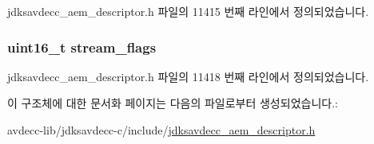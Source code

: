 jdksavdecc\+\_\+aem\+\_\+descriptor.\+h 파일의 11415 번째 라인에서 정의되었습니다.

\subsubsection[{\texorpdfstring{stream\+\_\+flags}{stream_flags}}]{\setlength{\rightskip}{0pt plus 5cm}uint16\+\_\+t stream\+\_\+flags}\hypertarget{structjdksavdecc__descriptor__stream_ae7a5037df4d2baee5b2d23e8c1add96e}{}\label{structjdksavdecc__descriptor__stream_ae7a5037df4d2baee5b2d23e8c1add96e}


jdksavdecc\+\_\+aem\+\_\+descriptor.\+h 파일의 11418 번째 라인에서 정의되었습니다.



이 구조체에 대한 문서화 페이지는 다음의 파일로부터 생성되었습니다.\+:\begin{DoxyCompactItemize}
\item 
avdecc-\/lib/jdksavdecc-\/c/include/\hyperlink{jdksavdecc__aem__descriptor_8h}{jdksavdecc\+\_\+aem\+\_\+descriptor.\+h}\end{DoxyCompactItemize}
